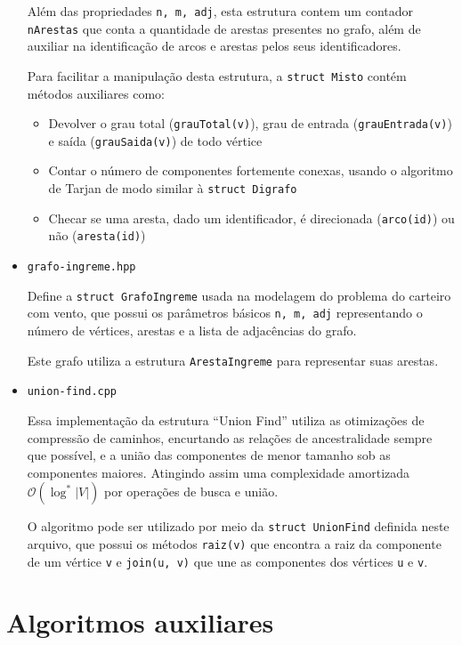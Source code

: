 \begin{itemize}
        Além das propriedades \texttt{n, m, adj}, esta estrutura contem um contador \texttt{nArestas} que conta a quantidade de arestas presentes no grafo, além de auxiliar na identificação de arcos e arestas pelos seus identificadores.

        Para facilitar a manipulação desta estrutura, a \texttt{struct Misto} contém métodos auxiliares como:
        \begin{itemize}
            \item  Devolver o grau total (\texttt{grauTotal(v)}), grau de entrada (\texttt{grauEntrada(v)}) e saída (\texttt{grauSaida(v)}) de todo vértice
            \item Contar o número de componentes fortemente conexas, usando o algoritmo de Tarjan de modo similar à \texttt{struct Digrafo}
            \item Checar se uma aresta, dado um identificador, é direcionada (\texttt{arco(id)}) ou não (\texttt{aresta(id)})
        \end{itemize}

    \item \texttt{grafo-ingreme.hpp}

    Define a \texttt{struct GrafoIngreme} usada na modelagem do problema do carteiro com vento, que possui os parâmetros básicos \texttt{n, m, adj} representando o número de vértices, arestas e a lista de adjacências do grafo.

    Este grafo utiliza a estrutura \texttt{ArestaIngreme} para representar suas arestas.

    \item \texttt{union-find.cpp}

        Essa implementação da estrutura ``Union Find'' utiliza as otimizações de compressão de caminhos, encurtando as relações de ancestralidade sempre que possível, e a união das componentes de menor tamanho sob as componentes maiores.
        Atingindo assim uma complexidade amortizada $\mathcal{O}(\log^*|V|)$ por operações de busca e união.

        O algoritmo pode ser utilizado por meio da \texttt{struct UnionFind} definida neste arquivo, que possui os métodos \texttt{raiz(v)} que encontra a raiz da componente de um vértice \texttt{v} e \texttt{join(u, v)} que une as componentes dos vértices \texttt{u} e \texttt{v}.

\end{itemize}

\section{Algoritmos auxiliares}

